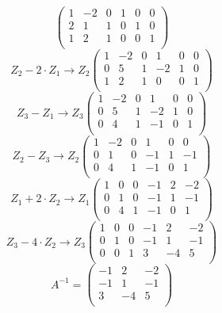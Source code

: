 \documentclass{article}
\begin{document}
\[\left(\begin{array}{ccc|ccc}
    1 & -2 & 0 & 1 & 0 & 0 \\
    2 & 1 & 1 & 0 & 1 & 0 \\
    1 & 2 & 1 & 0 & 0 & 1 \\
\end{array}\right)\]
\[Z_2 - 2 \cdot Z_1 \to Z_2 \left(\begin{array}{ccc|ccc}
    1 & -2 & 0 & 1 & 0 & 0 \\
    0 & 5 & 1 & -2 & 1 & 0 \\
    1 & 2 & 1 & 0 & 0 & 1 \\
\end{array}\right)\]
\[Z_3 - Z_1 \to Z_3 \left(\begin{array}{ccc|ccc}
    1 & -2 & 0 & 1 & 0 & 0 \\
    0 & 5 & 1 & -2 & 1 & 0 \\
    0 & 4 & 1 & -1 & 0 & 1 \\
\end{array}\right)\]
\[Z_2 - Z_3 \to Z_2 \left(\begin{array}{ccc|ccc}
    1 & -2 & 0 & 1 & 0 & 0 \\
    0 & 1 & 0 & -1 & 1 & -1 \\
    0 & 4 & 1 & -1 & 0 & 1 \\
\end{array}\right)\]
\[Z_1 + 2 \cdot Z_2 \to Z_1 \left(\begin{array}{ccc|ccc}
    1 & 0 & 0 & -1 & 2 & -2 \\
    0 & 1 & 0 & -1 & 1 & -1 \\
    0 & 4 & 1 & -1 & 0 & 1 \\
\end{array}\right)\]
\[Z_3 - 4 \cdot Z_2 \to Z_3 \left(\begin{array}{ccc|ccc}
    1 & 0 & 0 & -1 & 2 & -2 \\
    0 & 1 & 0 & -1 & 1 & -1 \\
    0 & 0 & 1 & 3 & -4 & 5 \\
\end{array}\right)\]
\[A^{-1} = \begin{pmatrix}
    -1 & 2 & -2 \\
    -1 & 1 & -1 \\
    3 & -4 & 5 \\
\end{pmatrix}\]
\end{document}
